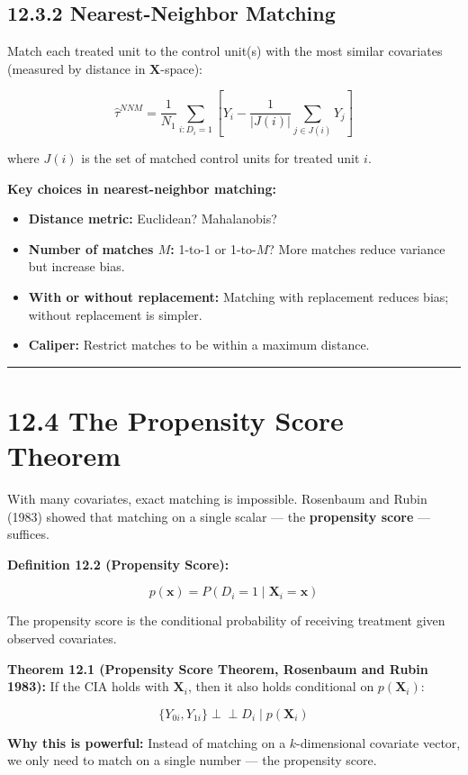 \subsection{12.3.2 Nearest-Neighbor Matching}

Match each treated unit to the control unit(s) with the most similar covariates (measured by distance in $\mathbf{X}$-space):

\[
\hat{\tau}^{NNM} = \frac{1}{N_1} \sum_{i: D_i = 1} \left[Y_i - \frac{1}{|J(i)|}\sum_{j \in J(i)} Y_j\right]
\]

where $J(i)$ is the set of matched control units for treated unit $i$.

\textbf{Key choices in nearest-neighbor matching:}
\begin{itemize}
\item \textbf{Distance metric:} Euclidean? Mahalanobis?
\item \textbf{Number of matches $M$:} 1-to-1 or 1-to-$M$? More matches reduce variance but increase bias.
\item \textbf{With or without replacement:} Matching with replacement reduces bias; without replacement is simpler.
\item \textbf{Caliper:} Restrict matches to be within a maximum distance.
\end{itemize}

\medskip\hrule\medskip

\section{12.4 The Propensity Score Theorem}

With many covariates, exact matching is impossible. Rosenbaum and Rubin (1983) showed that matching on a single scalar --- the \textbf{propensity score} --- suffices.

\textbf{Definition 12.2 (Propensity Score):}

\[
p(\mathbf{x}) = P(D_i = 1 \mid \mathbf{X}_i = \mathbf{x})
\]

The propensity score is the conditional probability of receiving treatment given observed covariates.

\textbf{Theorem 12.1 (Propensity Score Theorem, Rosenbaum and Rubin 1983):} If the CIA holds with $\mathbf{X}_i$, then it also holds conditional on $p(\mathbf{X}_i)$:

\[
\{Y_{0i}, Y_{1i}\} \perp\!\!\!\perp D_i \mid p(\mathbf{X}_i)
\]

\textbf{Why this is powerful:} Instead of matching on a $k$-dimensional covariate vector, we only need to match on a single number --- the propensity score.

